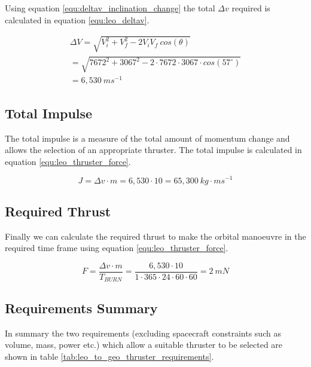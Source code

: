 \documentclass[a4paper, article, oneside, UKenglish]{memoir}
\newcommand{\0}{\mathbf{0}}
\newcommand{\1}{\mathbf{1}}
\begin{document}
Using equation \ref{equ:deltav_inclination_change} the total $ \Delta v $ required is calculated in equation \ref{equ:leo_deltav}.

\begin{equation}
\begin{split}
\Delta V = \sqrt{ V_i^2 + V_f^2 - 2 V_i V_f ~ cos( \theta ) } \\ 
= \sqrt{ 7672^2 + 3067^2 - 2 \cdot 7672 \cdot 3067 \cdot cos( 57^{\circ} ) } \\
= 6,530~ms^{-1}
\end{split}
\label{equ:leo_deltav}
\end{equation}


\subsection{Total Impulse}

The total impulse is a measure of the total amount of momentum change and allows the selection of an appropriate thruster.  The total impulse is calculated in equation \ref{equ:leo_thruster_force}.

\begin{equation}
J = \Delta v \cdot m = 6,530 \cdot 10 = 65,300 ~ kg \cdot ms^{-1}
\label{equ:leo_total_impulse}
\end{equation}


\subsection{Required Thrust}

Finally we can calculate the required thrust to make the orbital manoeuvre in the required time frame using equation \ref{equ:leo_thruster_force}.

\begin{equation}
F = \frac{\Delta v \cdot m}{T_{BURN}} = \frac{6,530 \cdot 10}{1 \cdot 365 \cdot 24 \cdot 60 \cdot 60} = 2 ~ mN
\label{equ:leo_thruster_force}
\end{equation}


\subsection{Requirements Summary}

In summary the two requirements (excluding spacecraft constraints such as volume, mass, power etc.) which allow a suitable thruster to be selected are shown in table \ref{tab:leo_to_geo_thruster_requirements}.
\end{document}
